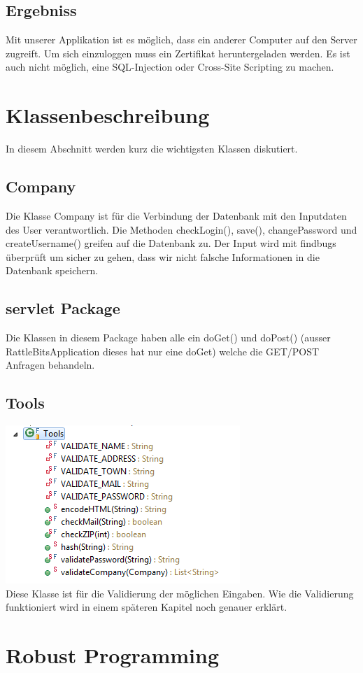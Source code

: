\documentclass[10pt]{article}
\begin{document}
\subsection{Ergebniss}
Mit unserer Applikation ist es möglich, dass ein anderer Computer auf den Server zugreift. Um sich einzuloggen muss ein Zertifikat heruntergeladen werden. Es ist auch nicht möglich, eine SQL-Injection oder Cross-Site Scripting zu machen.


\section{Klassenbeschreibung}
In diesem Abschnitt werden kurz die wichtigsten Klassen diskutiert.
\subsection{Company}
Die Klasse Company ist f\"{u}r die Verbindung der Datenbank mit den Inputdaten des User verantwortlich. Die Methoden checkLogin(), save(), changePassword und createUsername() greifen auf die Datenbank zu. Der Input wird mit findbugs \"{u}berpr\"{u}ft um sicher zu gehen, dass wir nicht falsche Informationen in die Datenbank speichern.
\subsection{servlet Package}
Die Klassen in diesem Package haben alle ein doGet() und doPost() (ausser RattleBitsApplication dieses hat nur eine doGet) welche die GET/POST Anfragen behandeln.
\subsection{Tools}
\includegraphics[scale=1]{tools.png}\\
Diese Klasse ist f\"{u}r die Validierung der m\"{o}glichen Eingaben. Wie die Validierung funktioniert wird in einem späteren Kapitel noch genauer erklärt.
\section{Robust Programming}
\end{document}
